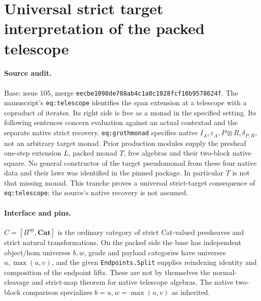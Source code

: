 \section*{Universal strict target interpretation of the packed telescope}
\paragraph{Source audit.} Base: issue 105, merge
\texttt{eecbe1098de788ab4c1a0c1028fcf10b9578624f}.
The manuscript's \texttt{eq:telescope} identifies the span extension at a
telescope with a coproduct of iterates. Its right side is free as a monad in
the specified setting. Its following sentences concern evaluation against
an actual contextad and the separate native strict recovery.
\texttt{eq:grothmonad} specifies native $I_A,\varepsilon_A, P\otimes R,
\delta_{P,R}$, not an arbitrary target monad. Prior production modules
supply the presheaf one-step extension $L$, packed monad $T$, free
algebras and their two-block native square. No general constructor of
the target pseudomonad from these four native data and their laws was
identified in the pinned package. In particular $T$ is not that missing
monad. This tranche proves a universal strict-target consequence of
\texttt{eq:telescope}; the source's native recovery is not assumed.
\paragraph{Interface and pins.}
$C=[B^{\mathrm{op}},\mathbf{Cat}]$ is the ordinary category of strict
Cat-valued presheaves and strict natural transformations. On the packed
side the base has independent object/hom universes $b,w$, grade and
payload categories have universes $u,\max(u,v)$, and the given
\texttt{Endpoints.Split} supplies reindexing identity and composition
of the endpoint lifts. These are not by themselves the normal-cleavage
and strict-map theorem for native telescope algebras. The native
two-block comparison specializes $b=u, w=\max(u,v)$ as inherited.

